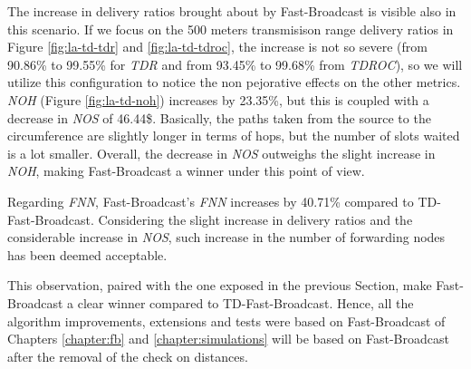 		The increase in delivery ratios brought about by Fast-Broadcast is visible also in this scenario. If we focus on the 500 meters transmisison range delivery ratios in Figure \ref{fig:la-td-tdr} and \ref{fig:la-td-tdroc}, the increase is not so severe (from 90.86\% to 99.55\% for \textit{TDR} and from 93.45\% to 99.68\% from \textit{TDROC}), so we will utilize this configuration to notice the non pejorative effects on the other metrics.
		\textit{NOH} (Figure \ref{fig:la-td-noh}) increases by 23.35\%, but this is coupled with a decrease in \textit{NOS} of 46.44\$. Basically, the paths taken from the source to the circumference are slightly longer in terms of hops, but the number of slots waited is a lot smaller. Overall, the decrease in \textit{NOS} outweighs the slight increase in \textit{NOH}, making Fast-Broadcast a winner under this point of view.
		
		
		Regarding \textit{FNN}, Fast-Broadcast's \textit{FNN} increases by 40.71\% compared to TD-Fast-Broadcast. Considering the slight increase in delivery ratios and the considerable increase in \textit{NOS}, such increase in the number of forwarding nodes has been deemed acceptable. 
		
		
		This observation, paired with the one exposed in the previous Section, make Fast-Broadcast a clear winner compared to TD-Fast-Broadcast. Hence, all the algorithm improvements, extensions and tests were based on Fast-Broadcast of Chapters \ref{chapter:fb} and \ref{chapter:simulations} will be based on Fast-Broadcast after the removal of the check on distances.
		
		